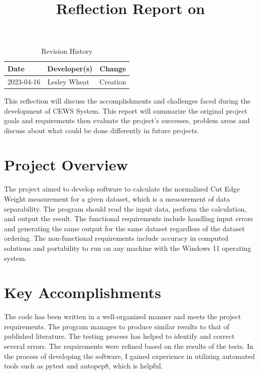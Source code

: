 \documentclass{article}
\title{Reflection Report on \progname}
\author{\authname}
\date{}
\begin{document}
\begin{table}[hp]
\caption{Revision History} \label{TblRevisionHistory}
\begin{tabularx}{\textwidth}{llX}
\toprule
\textbf{Date} & \textbf{Developer(s)} & \textbf{Change}\\
\midrule
2023-04-16 & Lesley Wheat & Creation \\
\bottomrule
\end{tabularx}
\end{table}

\newpage

\maketitle


This reflection will discuss the accomplishments and challenges faced during the development of CEWS System. 
This report will summarize the original project goals and requirements then evaluate the project's successes, problem areas and discuss about what could be done differently in future projects.

\section{Project Overview}

The project aimed to develop software to calculate the normalized Cut Edge Weight measurement for a given dataset, which is a measurement of data separability.
The program should read the input data, perform the calculation, and output the result. 
The functional requirements include handling input errors and generating the same output for the same dataset regardless of the dataset ordering.
The non-functional requirements include accuracy in computed solutions and portability to run on any machine with the Windows 11 operating system. 


\section{Key Accomplishments}

The code has been written in a well-organized manner and meets the project requirements.
The program manages to produce similar results to that of published literature.
The testing process has helped to identify and correct several errors.
The requirements were refined based on the results of the tests.
In the process of developing the software, I gained experience in utilizing automated tools such as pytest and autopep8, which is helpful. 
\end{document}
